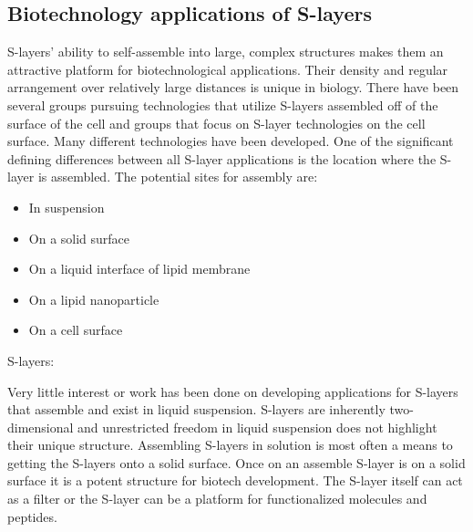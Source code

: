   \subsection{Biotechnology applications of S-layers}\label{sec:biot-appl-s}
  
  \Acp{S-layer}' ability to self-assemble into large, complex structures makes them an attractive platform for biotechnological applications. Their density and regular arrangement
over relatively large distances is unique in biology. There have been several groups pursuing technologies that utilize \acp{S-layer} assembled off of the surface of the cell and
groups that focus on \ac{S-layer} technologies on the cell surface. Many different technologies have been developed. One of the significant defining differences between all
\ac{S-layer} applications is the location where the \ac{S-layer} is assembled. The potential sites for assembly are:
  \begin{itemize}
  \item In suspension
  \item On a solid surface
  \item On a liquid interface of lipid membrane
  \item On a lipid nanoparticle
  \item On a cell surface
  \end{itemize} %
\acp{S-layer}:

  Very little interest or work has been done on developing applications for \acp{S-layer} that assemble and exist in liquid suspension. \Acp{S-layer} are inherently two-dimensional
and unrestricted freedom in liquid suspension does not highlight their unique structure. Assembling \acp{S-layer} in solution is most often a means to getting the \acp{S-layer}
onto a solid surface. Once on an assemble \ac{S-layer} is on a solid surface it is a potent structure for biotech development. The \ac{S-layer} itself can act as a filter or the
\ac{S-layer} can be a platform for functionalized molecules and peptides.

